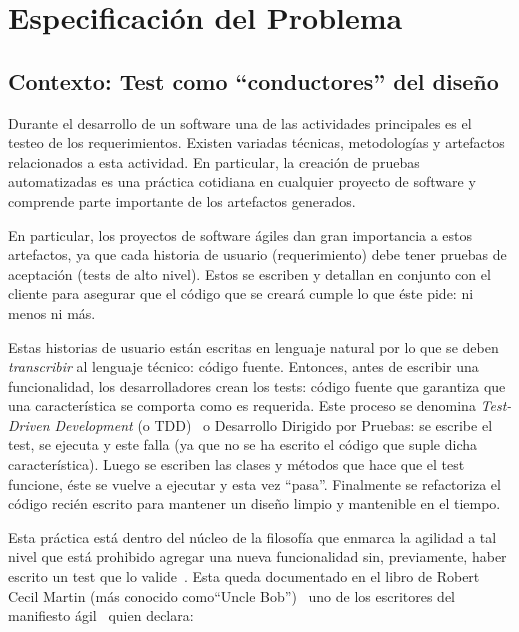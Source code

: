 \chapter{Especificación del Problema}



\section{Contexto: Test como ``conductores'' del diseño}
\par Durante el desarrollo de un software una de las actividades principales es el testeo de los requerimientos. Existen variadas técnicas, metodologías y artefactos relacionados a esta actividad. En particular, la creación de pruebas automatizadas es una práctica cotidiana en cualquier proyecto de software y comprende parte importante de los artefactos generados. \\

\par En particular, los proyectos de software ágiles dan gran importancia a estos artefactos, ya que cada historia de usuario (requerimiento) debe tener pruebas de aceptación (tests de alto nivel). Estos se escriben y detallan en conjunto con el cliente para asegurar que el código que se creará cumple lo que éste pide: ni menos ni más.

\par Estas historias de usuario están escritas en lenguaje natural por lo que se deben \emph{transcribir} al lenguaje técnico: código fuente. Entonces, antes de escribir una funcionalidad, los desarrolladores crean los tests: código fuente que garantiza que una característica se comporta como es requerida. Este proceso se denomina \emph{Test-Driven Development} (o TDD)~\cite{Beck02a}  o Desarrollo Dirigido por Pruebas: se escribe el test, se ejecuta y este falla (ya que no se ha escrito el código que suple dicha característica). Luego se escriben las clases y métodos que hace que el test funcione, éste se vuelve a ejecutar y esta vez ``pasa''. Finalmente se refactoriza el código recién escrito para mantener un diseño limpio y mantenible en el tiempo.

\par Esta práctica está dentro del núcleo de la filosofía que enmarca la agilidad a tal nivel que está prohibido agregar una nueva funcionalidad sin, previamente, haber escrito un test que lo valide~\cite{Beck02a}. Esta queda documentado en el libro de Robert Cecil Martin (más conocido como``Uncle Bob'')~\cite{Mart02b} uno de los escritores del manifiesto ágil~\cite{Fowl01a} quien declara:

